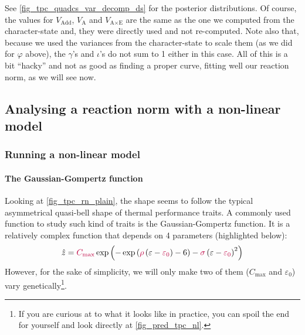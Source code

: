 \documentclass[a4paper,12pt,twoside]{article}
\begin{document}
See \autoref{fig_tpc_quadcs_var_decomp_ds} for the posterior distributions.
Of course, the values for $V_{\text{Add}}$, $V_{\text{A}}$ and $V_{\text{A}\times\text{E}}$ are the same as the one we computed from the character-state and, they were directly used and not re-computed.
Note also that, because we used the variances from the character-state to scale them (as we did for $\varphi$ above), the $\gamma$'s and $\iota$'s do not sum to 1 either in this case.
All of this is a bit ``hacky'' and not as good as finding a proper curve, fitting well our reaction norm, as we will see now.

\subsection{Analysing a reaction norm with a non-linear model}

\subsubsection{Running a non-linear model}
\label{subsubsec_nl_mod_ds}

\paragraph{The Gaussian-Gompertz function}
Looking at \autoref{fig_tpc_rn_plain}, the shape seems to follow the typical asymmetrical quasi-bell shape of thermal performance traits.
A commonly used function to study such kind of traits is the Gaussian-Gompertz function. It is a relatively complex function that depends on 4 parameters (highlighted below):
\begin{equation}
  \label{eq_gg}
  \hat{z} = \textcolor{purple}{C_{\text{max}}} 
  \exp\left(-\exp\left(\textcolor{purple}{\rho} \left(\varepsilon - \textcolor{purple}{\varepsilon_{0}}\right) - 6\right) -  \textcolor{purple}{\sigma} \left(\varepsilon - \textcolor{purple}{\varepsilon_{0}}\right)^2\right)
\end{equation}
However, for the sake of simplicity, we will only make two of them ($C_{\text{max}}$ and $\varepsilon_{0}$) vary genetically\footnote{If you are curious at to what it looks like in practice, you can spoil the end for yourself and look directly at \autoref{fig_pred_tpc_nl}.}.
\end{document}
